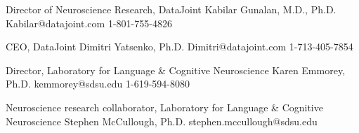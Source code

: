 

\begin{cventries}

  \iffalse %
  \cventry %
    {Smallcaps}
    {Bold}
    {Purple}
    {below purple} %
    {
      \begin{cvitems}
        \item {Description(s) bullet points}
      \end{cvitems}
    }
  \fi

  \cventry 
    {Director of Neuroscience Research, DataJoint} %
    {Kabilar Gunalan, M.D., Ph.D.} %
    {Kabilar@datajoint.com} %
    {1-801-755-4826} %
    {}

  \cventry 
  {CEO, DataJoint} %
  {Dimitri Yatsenko, Ph.D.} %
  {Dimitri@datajoint.com} %
  {1-713-405-7854} %
  {}

  \cventry 
    {Director, Laboratory for Language \& Cognitive Neuroscience} %
    {Karen Emmorey, Ph.D.} %
    {kemmorey@sdsu.edu} %
    {1-619-594-8080} %
    {} 

  \cventry 
    {Neuroscience research collaborator, Laboratory for Language \& Cognitive Neuroscience} %
    {Stephen McCullough, Ph.D.} %
    {stephen.mccullough@sdsu.edu} %
    {} %
    {}
\end{cventries}
